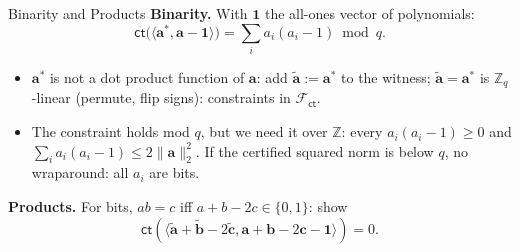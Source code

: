 \documentclass{zkdl-presentation-template}
\begin{document}
    \begin{frame}{Binarity and Products}
        \textbf{Binarity.} With $\mathbf{1}$ the all-ones vector of polynomials:
        \begin{equation*}
            \mathsf{ct}\big(\langle \mathbf{a}^{\ast}, \mathbf{a} - \mathbf{1} \rangle\big) = \sum_{i} a_i(a_i - 1) \bmod q.
        \end{equation*}
        \vspace{-15pt}
        \begin{itemize}
            \item $\mathbf{a}^{\ast}$ is not a dot product function of $\mathbf{a}$: add $\widetilde{\mathbf{a}} := \mathbf{a}^{\ast}$ to the witness; $\widetilde{\mathbf{a}} = \mathbf{a}^{\ast}$ is $\mathbb{Z}_q$-linear (permute, flip signs): constraints in $\mathcal{F}_{\mathsf{ct}}$.\pause
            \item The constraint holds mod $q$, but we need it over $\mathbb{Z}$: every $a_i(a_i - 1) \geq 0$ and $\sum_i a_i(a_i - 1) \leq 2\|\mathbf{a}\|_2^2$. If the certified squared norm is below $q$, no wraparound: all $a_i$ are bits.
        \end{itemize}
        \pause

        \textbf{Products.} For bits, $ab = c$ iff $a + b - 2c \in \{0, 1\}$: show
        \begin{equation*}
            \mathsf{ct}(\langle \widetilde{\mathbf{a}} + \widetilde{\mathbf{b}} - 2\widetilde{\mathbf{c}}, \mathbf{a} + \mathbf{b} - 2\mathbf{c} - \mathbf{1} \rangle) = 0.
        \end{equation*}
    \end{frame}
\end{document}
